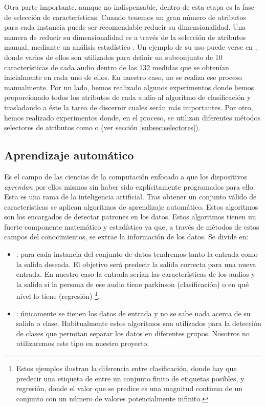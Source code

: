 Otra parte importante, aunque no indispensable, dentro de esta etapa es la fase de selección de características. Cuando tenemos un gran número de atributos para cada instancia puede ser recomendable reducir su dimensionalidad. Una manera de reducir su dimensionalidad es a través de la selección de atributos manual, mediante un análisis estadístico \cite{DMprocess}. Un ejemplo de su uso puede verse en \cite{MxLtNovel}, donde varios de ellos son utilizados para definir un subconjunto de 10 características de cada audio dentro de las 132 medidas que se obtenían inicialmente en cada uno de ellos. En nuestro caso, no se realiza ese proceso manualmente. Por un lado, hemos realizado algunos experimentos donde hemos proporcionado todos los atributos de cada audio al algoritmo de clasificación y trasladando a éste la tarea de discernir cuales serán más importantes. Por otro, hemos realizado experimentos donde, en el proceso, se utilizan diferentes métodos selectores de atributos como  o  (ver sección \ref{subsec:selectores}). 

\subsection{Aprendizaje automático}
Es el campo de las ciencias de la computación enfocado a que los dispositivos \textit{aprendan} por ellos mismos sin haber sido explícitamente programados para ello. Esta es una rama de la inteligencia artificial. Tras obtener un conjunto válido de características se aplican algoritmos de aprendizaje automático. Estos algoritmos son los encargados de detectar patrones en los datos. Estos algoritmos tienen un fuerte componente matemático y estadístico ya que, a través de métodos de estos campos del conocimientos, se extrae la información de los datos. Se divide en:
\begin{itemize}
	\item {}: para cada instancia del conjunto de datos tendremos tanto la entrada como la salida deseada. El objetivo será predecir la salida correcta para una nueva entrada. En nuestro caso la entrada serían las características de los audios y la salida si la persona de ese audio tiene parkinson (clasificación) o en qué nivel lo tiene (regresión) \footnote{Estos ejemplos ilustran la diferencia entre clasificación, donde hay que predecir una etiqueta de entre un conjunto finito de etiquetas posibles, y regresión, donde el valor que se predice es una magnitud continua de un conjunto con un número de valores potencialmente infinito.}.
	\item {}: únicamente se tienen los datos de entrada y no se sabe nada acerca de su salida o clase. Habitualmente estos algoritmos son utilizados para la detección de clases que permitan separar los datos en diferentes grupos. Nosotros no utilizaremos este tipo en nuestro proyecto.
\end{itemize}


